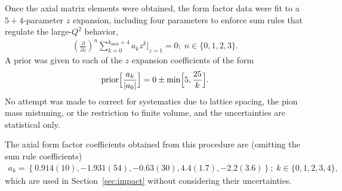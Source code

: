 Once the axial matrix elements were obtained,
 the form factor data were fit to a $5+4$-parameter $z$ expansion,
 including four parameters to enforce sum rules that regulate the large-$Q^2$ behavior,
\begin{align}
 \left( \frac{\partial}{\partial z} \right)^n
 \sum_{k=0}^{k_{\text{max}}+4} a_k z^k \Big|_{z=1} = 0; \; n \in \{0,1,2,3\}.
\end{align}
A prior was given to each of the $z$ expansion coefficients of the form
\begin{align}
 {\rm prior}\Big[ \frac{a_k}{|a_0|} \Big] = 0 \pm {\rm min} \Big[ 5, \frac{25}{k} \Big].
\end{align}
No attempt was made to correct for systematics due to lattice spacing,
 the pion mass mistuning, or the restriction to finite volume,
 and the uncertainties are statistical only.

The axial form factor coefficients obtained from this procedure are
 (omitting the sum rule coefficients)
\begin{align}
 a_k = \left\{ 0.914(10), -1.931(54), -0.63(30), 4.4(1.7), -2.2(3.6) \right\};
 \; k \in \{0,1,2,3,4\},
\end{align}
which are used in Section~\ref{sec:impact} without considering their uncertainties.

